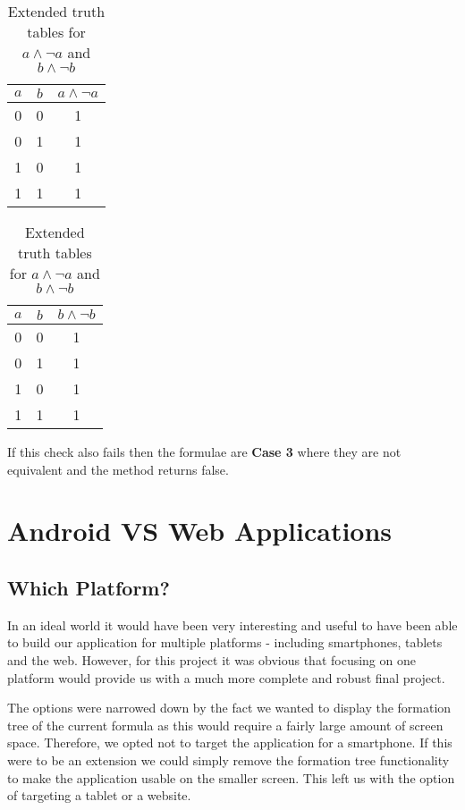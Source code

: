 \documentclass[draft]{report}
\begin{document}
\begin{table}[h]
  \begin{center}
\begin{tabular}{ | c | c || c | }
      \hline
      $a$ & $b$ & $a\land\lnot a$ \\ \hline
      0 & 0 & 1 \\
      0 & 1 & 1 \\
      1 & 0 & 1 \\
      1 & 1 & 1 \\
      \hline
\end{tabular}
\hspace{15mm}
\begin{tabular}{ | c | c || c | }
      \hline
      $a$ & $b$ & $b\land\lnot b$ \\ \hline
      0 & 0 & 1 \\
      0 & 1 & 1 \\
      1 & 0 & 1 \\
      1 & 1 & 1 \\
      \hline
\end{tabular}
  \end{center}
  \caption{Extended truth tables for $a\land\lnot a$ and $b\land\lnot b$}
  \label{table:extended_a_and_not_a}
\end{table}

If this check also fails then the formulae are \textbf{Case 3} where they are not equivalent and the method returns false.

\chapter{Android VS Web Applications}
\label{chap:android_vs_web}

\section{Which Platform?}

In an ideal world it would have been very interesting and useful to have been able to build our application for multiple platforms - including smartphones, tablets and the web. However, for this project it was obvious that focusing on one platform would provide us with a much more complete and robust final project.

The options were narrowed down by the fact we wanted to display the formation tree of the current formula as this would require a fairly large amount of screen space. Therefore, we opted not to target the application for a smartphone. If this were to be an extension we could simply remove the formation tree functionality to make the application usable on the smaller screen. This left us with the option of targeting a tablet or a website.
\end{document}
